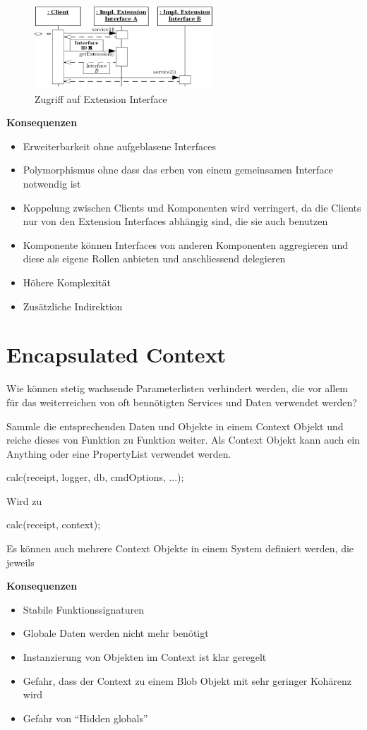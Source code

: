 \begin{figure}[H]
	\centering
	\includegraphics[width=0.6\textwidth]{content/advancedPatterns/extensioninterfaceusage.png}
	\caption{Zugriff auf Extension Interface}
\end{figure}

\textbf{Konsequenzen}

\begin{itemize}
	\item Erweiterbarkeit ohne aufgeblasene Interfaces
	\item Polymorphismus ohne dass das erben von einem gemeinsamen Interface notwendig ist
	\item Koppelung zwischen Clients und Komponenten wird verringert, da die Clients nur von den Extension Interfaces abhängig sind, die sie auch benutzen
	\item Komponente können Interfaces von anderen Komponenten aggregieren und diese als eigene Rollen anbieten und anschliessend delegieren
	\item Höhere Komplexität
	\item Zusätzliche Indirektion
\end{itemize}

\section{Encapsulated Context}

Wie können stetig wachsende Parameterlisten verhindert werden, die vor allem für das weiterreichen von oft bennötigten Services und Daten verwendet werden?

Sammle die entsprechenden Daten und Objekte in einem Context Objekt und reiche dieses von Funktion zu Funktion weiter. Als Context Objekt kann auch ein Anything oder eine PropertyList verwendet werden.

calc(receipt, logger, db, cmdOptions, ...);

Wird zu

calc(receipt, context);

Es können auch mehrere Context Objekte in einem System definiert werden, die jeweils 

\textbf{Konsequenzen}

\begin{itemize}
	\item Stabile Funktionssignaturen
	\item Globale Daten werden nicht mehr benötigt
	\item Instanzierung von Objekten im Context ist klar geregelt
	\item Gefahr, dass der Context zu einem Blob Objekt mit sehr geringer Kohärenz wird
	\item Gefahr von ``Hidden globals''
\end{itemize}
